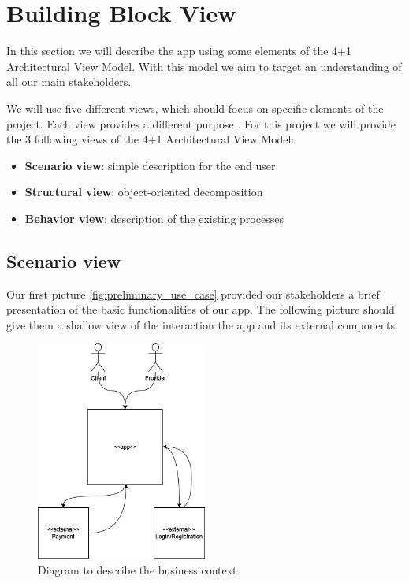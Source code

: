 \section{Building Block View}

In this section we will describe the \gls{app} using some elements of the 4+1 Architectural View Model. With this model we
aim to target an understanding of all our main stakeholders.

We will use five different views, which should focus on specific elements of the project. Each view provides a different
purpose \cite{refart:KR41}. For this project we will provide the 3 following views of the 4+1 Architectural View 
Model:

\begin{itemize}
    \item \textbf{Scenario view}: simple description for the end user 
    \item \textbf{Structural view}: object-oriented decomposition
    \item \textbf{Behavior view}: description of the existing processes
\end{itemize}

\subsection{Scenario view}

Our first picture \ref{fig:preliminary_use_case} provided our stakeholders a brief presentation of the basic functionalities
of our app. The following picture should give them a shallow view of the interaction the app and its external components.

\begin{figure}[H]
    \centering
    \includegraphics[width=0.5\textwidth]{assets/business_context.jpg}
    \caption{Diagram to describe the business context}
    \label{fig:business_context}
\end{figure}


